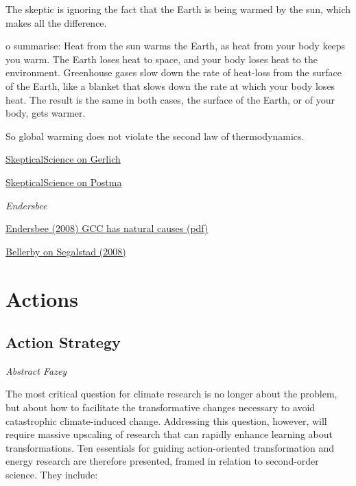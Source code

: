 \documentclass[
]{book}
\begin{document}
The skeptic is ignoring the fact that the Earth is being warmed by the sun, which makes all the difference.

o summarise: Heat from the sun warms the Earth, as heat from your body keeps you warm. The Earth loses heat to space, and your body loses heat to the environment. Greenhouse gases slow down the rate of heat-loss from the surface of the Earth, like a blanket that slows down the rate at which your body loses heat. The result is the same in both cases, the surface of the Earth, or of your body, gets warmer.

So global warming does not violate the second law of thermodynamics.

\href{https://skepticalscience.com/Second-law-of-thermodynamics-greenhouse-theory.htm}{SkepticalScience on Gerlich}

\href{https://skepticalscience.com/postma-disproved-the-greenhouse-effect.htm}{SkepticalScience on Postma}

\emph{Endersbee}

\href{pdf/Endersbee_2008_GCC_has_natural_causes.pdf}{Endersbee (2008) GCC has natural causes (pdf)}

\href{https://forskning.no/klima-kronikk/kronikk-co2-okningen-er-ikke-naturlig/1183609}{Bellerby on Segalstad (2008)}

\hypertarget{part-actions}{%
\part{Actions}\label{part-actions}}

\hypertarget{action-strategy}{%
\chapter{Action Strategy}\label{action-strategy}}

\emph{Abstract Fazey}

The most critical question for climate research is no longer about the problem,
but about how to facilitate the transformative changes necessary to avoid
catastrophic climate-induced change.
Addressing this question, however, will require massive upscaling of research
that can rapidly enhance learning about transformations.
Ten essentials for guiding action-oriented transformation and energy research are therefore presented,
framed in relation to second-order science.
They include:
\end{document}
